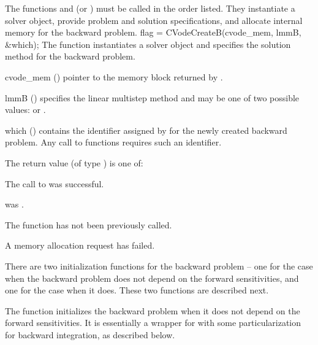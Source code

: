 The functions  and  (or ) must be
called in the order listed. They instantiate a {\cvodes} solver object, provide problem
and solution specifications, and allocate internal memory for the backward problem.
{
  flag = CVodeCreateB(cvode\_mem, lmmB, \&which);
}
{
  The function  instantiates a {\cvodes} solver object and specifies
  the solution method for the backward problem.
}
{
  \begin{args}
  \item[cvode\_mem] ()
    pointer to the {\cvodes} memory block returned by .
  \item[lmmB] ()
    specifies the linear multistep method and may be one of two
    possible values:  or .
  \item[which] ()
    contains the identifier assigned by {\cvodes} for the newly created backward
    problem. Any call to  functions requires such an identifier.
  \end{args}
}
{
   The return value  (of type ) is one of:
   \begin{args}
   \item[\Id{CV\_SUCCESS}]
     The call to  was successful.
   \item[\Id{CV\_MEM\_NULL}]
      was .
   \item[\Id{CV\_NO\_ADJ}]
     The function  has not been previously called.
   \item[\Id{CV\_MEM\_FAIL}]
     A memory allocation request has failed.
   \end{args}
}
{}

There are two initialization functions for the backward problem -- one for
the case when the backward problem does not depend on the forward
sensitivities, and one for the case when it does.  These two functions
are described next.

The function  initializes the backward problem when it does
not depend on the forward sensitivities.  It is essentially a wrapper for
 with some particularization for backward integration, as described below.

